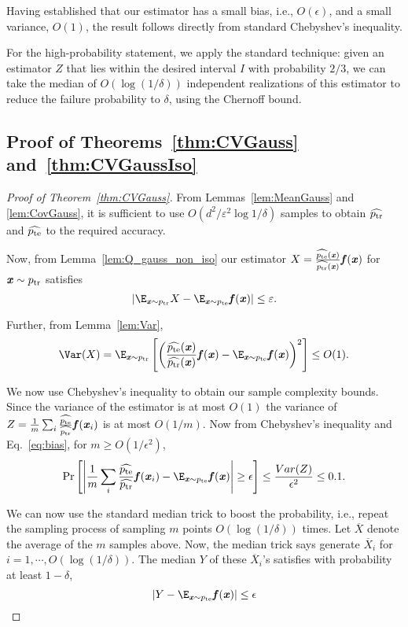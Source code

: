 Having established that our estimator has a small bias, i.e., $O(\epsilon)$, and a small variance, $O(1)$, the result follows directly from standard Chebyshev's inequality. 

For the high-probability statement, we apply the standard technique: given an estimator $Z$ that lies within the desired interval $I$ with probability $2/3$, we can take the median of $O(\log(1/\delta))$ independent realizations of this estimator to reduce the failure probability to $\delta$, using the Chernoff bound.

\subsection*{Proof of Theorems~\ref{thm:CVGauss} and~\ref{thm:CVGaussIso}}
\begin{proof}[Proof of Theorem~\ref{thm:CVGauss}]

From Lemmas~\ref{lem:MeanGauss} and \ref{lem:CovGauss}, it is sufficient to use $O(d^2/\varepsilon^2 \log1/\delta)$ samples to obtain $\widehat{p_{\mathrm{tr}}}$ and $\widehat{p_{\mathrm{te}}}$ to the required accuracy.

Now, from Lemma~\ref{lem:Q_gauss_non_iso} our estimator $X = \frac{\widehat{p_{\mathrm{te}}}(\boldsymbol{\mathit{x}})}{\widehat{p_{\mathrm{tr}}}(\boldsymbol{\mathit{x}})}\boldsymbol{\mathit{f}}(\boldsymbol{\mathit{x}})$ for $\boldsymbol{\mathit{x}} \sim p_{\mathrm{tr}}$ satisfies 
\begin{equation}\label{eq:bias}
    |\E_{\xx\sim \ptr} X - \E_{\xx\sim \pte}\ff(\xx)| \leq \varepsilon.
\end{equation}


Further, from Lemma~\ref{lem:Var}, 
\[
\Var(X) = \E_{\xx\sim \ptr} \left[\left(\frac{\widehat{\pte}(\xx)}{\widehat{\ptr}(\xx)}\ff(\xx) - \E_{\xx\sim\pte}\ff(\xx)\right)^2\right] \leq O(1).
\]

We now use Chebyshev's inequality to obtain our sample complexity bounds. Since the variance of the estimator is at most $O(1)$ the variance of $Z =\frac{1}{m}\sum_i \frac{\widehat{p_{\mathrm{te}}}}{\widehat{p_{\mathrm{tr}}}}\boldsymbol{\mathit{f}}(\boldsymbol{\mathit{x}}_i)$ is at most $O(1/m)$. Now from Chebyshev's inequality and Eq.~\eqref{eq:bias}, for $m\geq O(1/\epsilon^2)$,
\[
\Pr\left[\left|\frac{1}{m}\sum_i \frac{\widehat{\pte}}{\widehat{\ptr}}\ff(\xx_i)-\E_{\xx\sim \pte}\ff(\xx)\right|\geq \epsilon\right] \leq \frac{Var(Z)}{\epsilon^2}\leq 0.1.
\]

We can now use the standard median trick to boost the probability, i.e., repeat the sampling process of sampling $m$ points $O(\log (1/\delta))$ times. Let $\overline{X}$ denote the average of the $m$ samples above. Now, the median trick says generate $\overline{X}_i$ for $i =1,\cdots, O(\log(1/\delta))$. The median $Y$ of these $\overline{X}_i$'s satisfies with probability at least $1-\delta$,
\[
|Y - \E_{\xx\sim\pte}\ff(\xx)|\leq \epsilon
\]
\end{proof}


